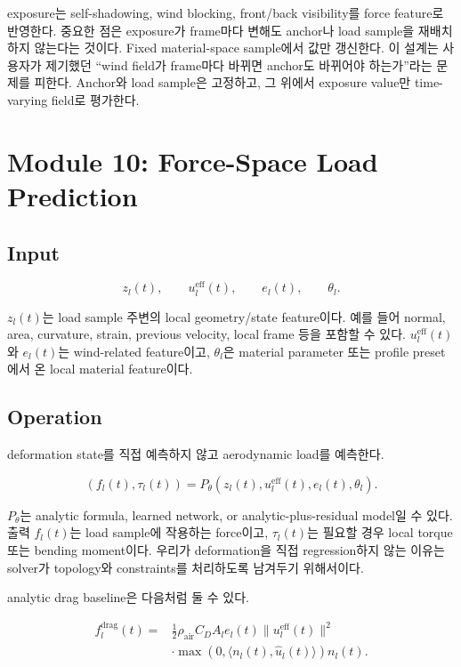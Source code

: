 \documentclass[11pt,a4paper]{article}
\begin{document}
exposure는 self-shadowing, wind blocking, front/back visibility를 force feature로 반영한다. 중요한 점은 exposure가 frame마다 변해도 anchor나 load sample을 재배치하지 않는다는 것이다. Fixed material-space sample에서 값만 갱신한다.
이 설계는 사용자가 제기했던 ``wind field가 frame마다 바뀌면 anchor도 바뀌어야 하는가''라는 문제를 피한다.
Anchor와 load sample은 고정하고, 그 위에서 exposure value만 time-varying field로 평가한다.

\section{Module 10: Force-Space Load Prediction}

\subsection*{Input}

\begin{equation}
z_l(t),\qquad u_l^{\mathrm{eff}}(t),\qquad e_l(t),\qquad \theta_l.
\end{equation}

$z_l(t)$는 load sample 주변의 local geometry/state feature이다.
예를 들어 normal, area, curvature, strain, previous velocity, local frame 등을 포함할 수 있다.
$u_l^{\mathrm{eff}}(t)$와 $e_l(t)$는 wind-related feature이고, $\theta_l$은 material parameter 또는 profile preset에서 온 local material feature이다.

\subsection*{Operation}

deformation state를 직접 예측하지 않고 aerodynamic load를 예측한다.

\begin{equation}
(f_l(t),\tau_l(t))=P_\theta(z_l(t),u_l^{\mathrm{eff}}(t),e_l(t),\theta_l).
\end{equation}

$P_\theta$는 analytic formula, learned network, or analytic-plus-residual model일 수 있다.
출력 $f_l(t)$는 load sample에 작용하는 force이고, $\tau_l(t)$는 필요할 경우 local torque 또는 bending moment이다.
우리가 deformation을 직접 regression하지 않는 이유는 solver가 topology와 constraints를 처리하도록 남겨두기 위해서이다.

analytic drag baseline은 다음처럼 둘 수 있다.

\begin{equation}
\begin{aligned}
f_l^{\mathrm{drag}}(t)=&
\frac{1}{2}\rho_{\mathrm{air}}C_DA_l e_l(t)
\|u_l^{\mathrm{eff}}(t)\|^2\\
&\cdot \max(0,\langle n_l(t),\hat{u}_l(t)\rangle)n_l(t).
\end{aligned}
\end{equation}
\end{document}
